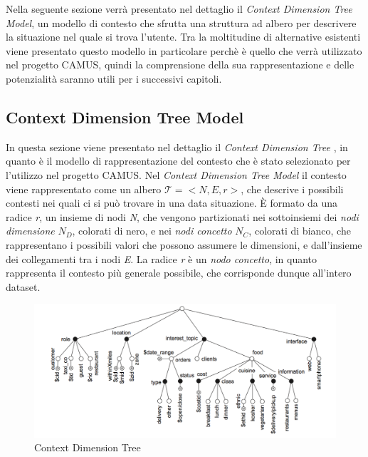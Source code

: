 Nella seguente sezione verrà presentato nel dettaglio il \emph{Context Dimension Tree Model}, un modello di contesto che sfrutta una struttura ad albero per descrivere la situazione nel quale si trova l'utente. Tra la moltitudine di alternative esistenti viene presentato questo modello in particolare perchè è quello che verrà utilizzato nel progetto CAMUS, quindi la comprensione della sua rappresentazione e delle potenzialità saranno utili per i successivi capitoli.

\subsection{Context Dimension Tree Model\label{sec:context-dimension-model}}

In questa sezione viene presentato nel dettaglio il \emph{Context Dimension Tree} \cite{DBLP:journals/is/BolchiniQT13}, in quanto è il modello di rappresentazione del contesto che è stato selezionato per l'utilizzo nel progetto CAMUS. Nel \emph{Context Dimension Tree Model} il contesto viene rappresentato come un albero $\mathcal{T} = {<}N, E, r{>} $, che descrive i possibili contesti nei quali ci si può trovare in una data situazione. \`E formato da una radice \emph{r}, un insieme di nodi \emph{N}, che vengono partizionati nei sottoinsiemi dei \emph{nodi dimensione} $N_D$, colorati di nero, e nei \emph{nodi concetto} $N_C$, colorati di bianco, che rappresentano i possibili valori che possono assumere le dimensioni, e dall'insieme dei collegamenti tra i nodi \emph{E}. La radice \emph{r} è un \emph{nodo concetto}, in quanto rappresenta il contesto più generale possibile, che corrisponde dunque all'intero dataset.

\begin{figure}[ht]
	\centering
	\includegraphics[width=\textwidth]{2-nozioni-preliminari/Immagini/esempio_cdt.png}
	\caption{Context Dimension Tree}\label{fig:context-dimension-tree}
\end{figure}

